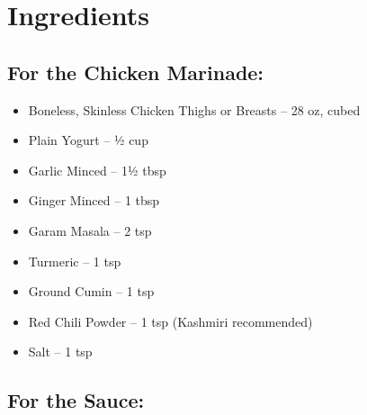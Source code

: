 




\section*{Ingredients}

\subsection*{For the Chicken Marinade:}

\begin{itemize}[itemsep=0.1em, label={\raisebox{-0.1ex}{\large\textbullet}}]
      \item[\cut] Boneless, Skinless Chicken Thighs or Breasts – 28 oz, cubed
      \item[\measure] Plain Yogurt – ½ cup
      \item[\cut] Garlic Minced – 1½ tbsp
      \item[\cut] Ginger Minced – 1 tbsp
      \item[\measure] Garam Masala – 2 tsp
      \item[\measure] Turmeric – 1 tsp
      \item[\measure] Ground Cumin – 1 tsp
      \item[\measure] Red Chili Powder – 1 tsp (Kashmiri recommended)
      \item[\measure] Salt – 1 tsp
\end{itemize}

\subsection*{For the Sauce:}

